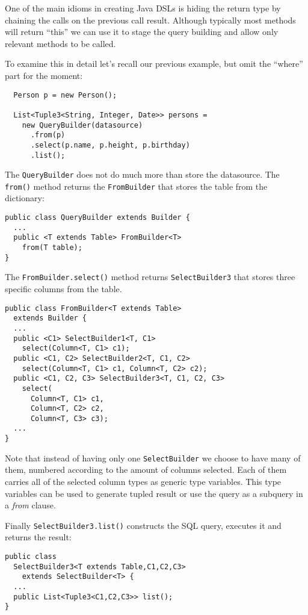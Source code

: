 \documentclass{sig-alternate}
\begin{document}
One of the main idioms in creating Java DSLs is hiding the return type by chaining the calls on the previous call result. Although typically most methods will return ``this'' we can use it to stage the query building and allow only relevant methods to be called.

To examine this in detail let's recall our previous example, but omit the ``where'' part for the moment:

\begin{verbatim}
  Person p = new Person();

  List<Tuple3<String, Integer, Date>> persons = 
    new QueryBuilder(datasource)
      .from(p)
      .select(p.name, p.height, p.birthday)
      .list();
\end{verbatim}


The \verb!QueryBuilder! does not do much more than store the datasource. The \verb!from()! method returns the \verb!FromBuilder! that stores the table from the dictionary:

\begin{verbatim}
public class QueryBuilder extends Builder {
  ...
  public <T extends Table> FromBuilder<T> 
    from(T table);
}
\end{verbatim}

The \verb!FromBuilder.select()! method returns \verb!SelectBuilder3! that stores three specific columns from the table. 

\begin{verbatim}
public class FromBuilder<T extends Table> 
  extends Builder {
  ...
  public <C1> SelectBuilder1<T, C1> 
    select(Column<T, C1> c1);
  public <C1, C2> SelectBuilder2<T, C1, C2> 
    select(Column<T, C1> c1, Column<T, C2> c2);
  public <C1, C2, C3> SelectBuilder3<T, C1, C2, C3> 
    select(
      Column<T, C1> c1, 
      Column<T, C2> c2, 
      Column<T, C3> c3);
  ...
}
\end{verbatim}

Note that instead of having only one \verb!SelectBuilder! we choose to have many of them, numbered according to the amount of columns selected. Each of them carries all of the selected column types as generic type variables. This type variables can be used to generate tupled result or use the query as a subquery in a \emph{from} clause.

Finally \verb!SelectBuilder3.list()! constructs the SQL query, executes it and returns the result:

\begin{verbatim}
public class
  SelectBuilder3<T extends Table,C1,C2,C3> 
    extends SelectBuilder<T> {
  ...
  public List<Tuple3<C1,C2,C3>> list();
} 
\end{verbatim}
\end{document}
